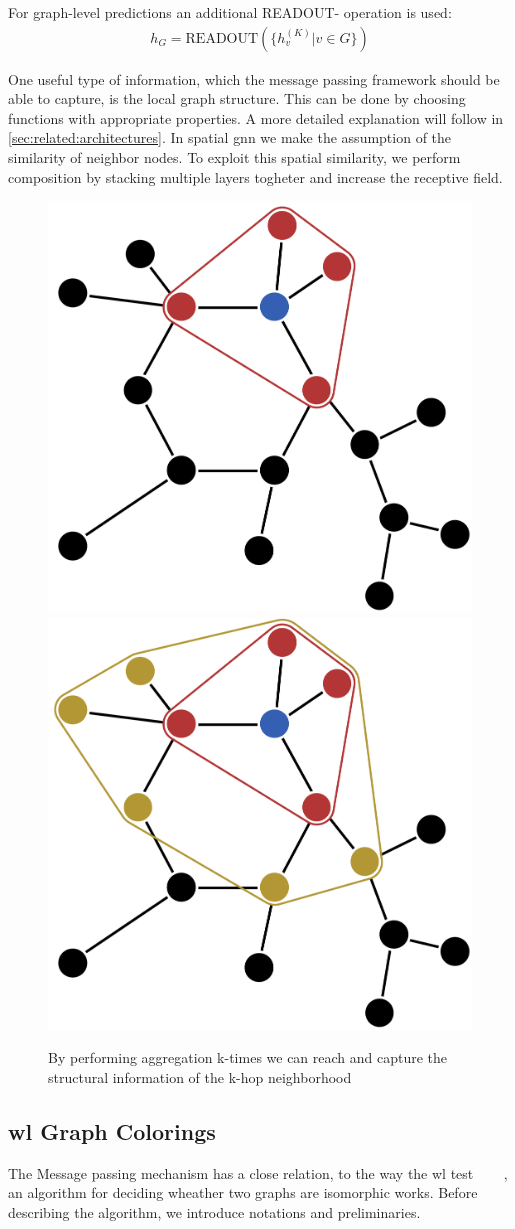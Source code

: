 For graph-level predictions an additional READOUT- operation is used:
\begin{align*}
    h_{G} =\mathrm{READOUT}(\{h_{v}^{(K)}| v \in G\})
\end{align*}

One useful type of information, which the message passing framework should be able to
capture, is the local graph structure. This can be done by choosing functions with
appropriate properties. A more detailed explanation will follow in
\cref{sec:related:architectures}. In spatial \ac{gnn} we make the assumption of the
similarity of neighbor nodes. To exploit this spatial similarity, we perform
composition by stacking multiple layers togheter and increase the receptive field.

\begin{figure}[ht]
    \centering
    \includegraphics[width=0.35\linewidth]{gfx/related-work/1hop}\hspace{1cm}
    \includegraphics[width=0.35\linewidth]{gfx/related-work/2hop}
    \caption{By performing aggregation k-times we can reach and capture the
        structural information of the k-hop neighborhood}\label{fig:related:1hop}
\end{figure}


\subsection{\acl{wl} Graph Colorings}
\label{sec:related:character:wl}
The Message passing mechanism has a close relation, to the way the \acf{wl} test ~\cite{Weisfeiler1968}
~\cite{Damke2020}~\cite{Huang2022}, an algorithm for deciding wheather two graphs are isomorphic works.
Before describing the algorithm, we introduce notations and preliminaries.\\

